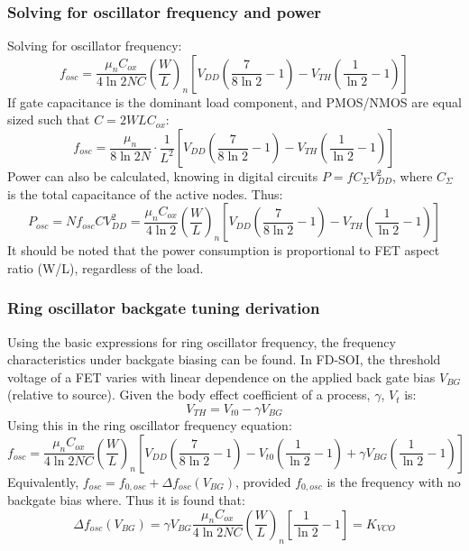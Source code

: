 		\subsubsection{Solving for oscillator frequency and power}
			Solving for oscillator frequency:
			\begin{equation}\label{eq:osc_freq_w_l}
				f_{osc} = \frac{\mu_nC_{ox}}{4\ln2NC}\left(\frac{W}{L}\right)_n\left[V_{DD}\left(\frac{7}{8\ln2}-1\right)-V_{TH}\left(\frac{1}{\ln2}-1\right) \right]
			\end{equation}
			If gate capacitance is the dominant load component, and PMOS/NMOS are equal sized such that $C=2WLC_{ox}$:
			\begin{equation}
				f_{osc} = \frac{\mu_n}{8\ln2N}\cdot\frac{1}{L^2}\left[V_{DD}\left(\frac{7}{8\ln2}-1\right)-V_{TH}\left(\frac{1}{\ln2}-1\right) \right]
			\end{equation}
			Power can also be calculated, knowing in digital circuits $P = fC_{\Sigma}V_{DD}^2$, where $C_{\Sigma}$ is the total capacitance of the active nodes. Thus:
			\begin{equation}\label{eq:osc_pow_consumption}
				P_{osc} = Nf_{osc}CV_{DD}^2 = \frac{\mu_nC_{ox}}{4\ln2}\left(\frac{W}{L}\right)_n\left[V_{DD}\left(\frac{7}{8\ln2}-1\right)-V_{TH}\left(\frac{1}{\ln2}-1\right) \right]
			\end{equation}
			It should be noted that the power consumption is proportional to FET aspect ratio (W/L), regardless of the load.

	\subsubsection{Ring oscillator backgate tuning derivation}
		Using the basic expressions for ring oscillator frequency, the frequency characteristics under backgate biasing can be found. In FD-SOI, the threshold voltage of a FET varies with linear dependence on the applied back gate bias $V_{BG}$ (relative to source). Given the body effect coefficient of a process, $\gamma$, $V_t$ is:
		\begin{equation}
			V_{TH} = V_{t0} - \gamma V_{BG}
		\end{equation}
		Using this in the ring oscillator frequency equation:
		\begin{equation}
			f_{osc} = \frac{\mu_nC_{ox}}{4\ln2NC}\left(\frac{W}{L}\right)_n\left[V_{DD}\left(\frac{7}{8\ln2}-1\right)-V_{t0}\left(\frac{1}{\ln2}-1\right) + \gamma V_{BG}\left(\frac{1}{\ln2}-1\right) \right]
		\end{equation}
		Equivalently, $f_{osc} = f_{0,osc} + \Delta f_{osc}(V_{BG})$, provided $f_{0,osc}$ is the frequency with no backgate bias where. Thus it is found that:
		\begin{equation}\label{eq:kvco_}
			\Delta f_{osc}(V_{BG}) = \gamma V_{BG}\frac{\mu_nC_{ox}}{4\ln2NC}\left(\frac{W}{L}\right)_n\left[\frac{1}{\ln2}-1\right] = K_{VCO}
		\end{equation}	


